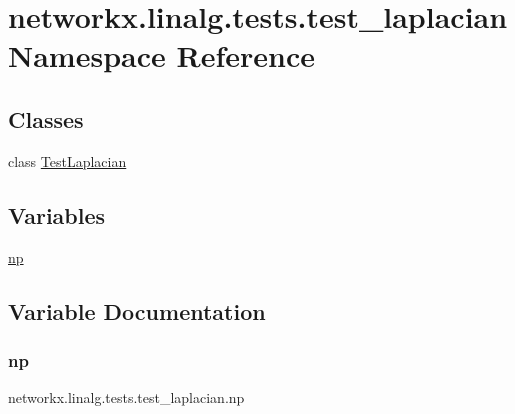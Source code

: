 \hypertarget{namespacenetworkx_1_1linalg_1_1tests_1_1test__laplacian}{}\section{networkx.\+linalg.\+tests.\+test\+\_\+laplacian Namespace Reference}
\label{namespacenetworkx_1_1linalg_1_1tests_1_1test__laplacian}
\subsection*{Classes}
\begin{DoxyCompactItemize}
\item 
class \hyperlink{classnetworkx_1_1linalg_1_1tests_1_1test__laplacian_1_1TestLaplacian}{Test\+Laplacian}
\end{DoxyCompactItemize}
\subsection*{Variables}
\begin{DoxyCompactItemize}
\item 
\hyperlink{namespacenetworkx_1_1linalg_1_1tests_1_1test__laplacian_ad84ee06625b15d90dc2a45dfab08ec13}{np}
\end{DoxyCompactItemize}


\subsection{Variable Documentation}
\mbox{\label{namespacenetworkx_1_1linalg_1_1tests_1_1test__laplacian_ad84ee06625b15d90dc2a45dfab08ec13}} 
\subsubsection{\texorpdfstring{np}{np}}
{\footnotesize\ttfamily networkx.\+linalg.\+tests.\+test\+\_\+laplacian.\+np}

